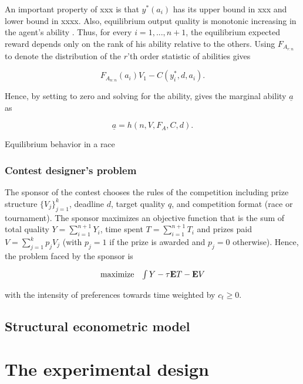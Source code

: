 \documentclass[12pt,]{article}
\begin{document}
An important property of xxx is that \(y^*(a_i)\) has its upper bound in
xxx and lower bound in xxxx. Also, equilibrium output quality is
monotonic increasing in the agent's ability
\citep[see][]{moldovanu2001optimal}. Thus, for every \(i=1, ..., n+1\),
the equilibrium expected reward depends only on the rank of his ability
relative to the others. Using \({F_{A_{r:n}}}\) to denote the
distribution of the \(r\)'th order statistic of abilities gives

\[\label{eq: expected payoffs tournament}
  {F_{A_{n:n}}}(a_i) V_1  - C(y_i^*, d, a_i).\]

Hence, by setting to zero and solving for the ability, gives the
marginal ability \({\underline a}\) as

\[{\underline a}= h(n, V, F_A, C, d).\]

\begin{corollary}

Equilibrium behavior in a race

\end{corollary}

\subsubsection{Contest designer's
problem}\label{contest-designers-problem}

The sponsor of the contest chooses the rules of the competition
including prize structure \(\{V_j\}_{j=1}^k\), deadline \(d\), target
quality \(q\), and competition format (race or tournament). The sponsor
maximizes an objective function that is the sum of total quality
\(Y=\sum_{i=1}^{n+1} Y_i\), time spent \(T=\sum_{i=1}^{n+1} T_i\) and
prizes paid \(V=\sum_{j=1}^k p_{j} V_j\) (with \(p_j=1\) if the prize is
awarded and \(p_j=0\) otherwise). Hence, the problem faced by the
sponsor is

\[\begin{array}{ll}
    \mbox{maximize} & \int {Y}   -  {\tau}{{\bf E}}{T} - {{\bf E}}{V}
  \end{array}\]

with the intensity of preferences towards time weighted by
\(c_t\geq 0\).

\subsection{Structural econometric
model}\label{structural-econometric-model}

\section{The experimental design}\label{the-experimental-design}
\end{document}

